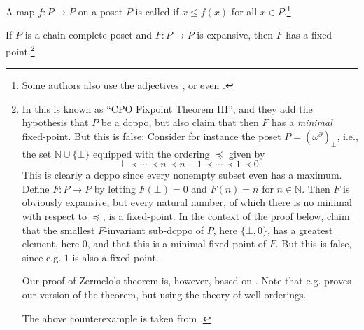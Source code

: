 \documentclass[a4paper, 11pt, article, danish, oneside]{memoir}
\newcommand{\naturals}{\mathbb{N}}
\newcommand*\union\cup
\begin{document}
A map $f \colon P \to P$ on a poset $P$ is called  if $x \leq f(x)$ for all $x \in P$.\footnote{Some authors also use the adjectives ,  or even .}

\begin{theorem}
    If $P$ is a chain-complete poset and $F \colon P \to P$ is expansive, then $F$ has a fixed-point.\footnote{In \textcite{davey-priestley-order} this is known as \enquote{CPO Fixpoint Theorem III}, and they add the hypothesis that $P$ be a dcppo, but also claim that then $F$ has a \emph{minimal} fixed-point. But this is false: Consider for instance the poset $P = (\omega^\partial)_\bot$, i.e., the set $\naturals \union \{\bot\}$ equipped with the ordering $\preceq$ given by
    \begin{equation*}
        \bot \prec \cdots \prec n \prec n-1 \prec \cdots \prec 1 \prec 0.
    \end{equation*}
    This is clearly a dcppo since every nonempty subset even has a maximum. Define $F \colon P \to P$ by letting $F(\bot) = 0$ and $F(n) = n$ for $n \in \naturals$. Then $F$ is obviously expansive, but every natural number, of which there is no minimal with respect to $\preceq$, is a fixed-point. In the context of the proof below, \citeauthor{davey-priestley-order} claim that the smallest $F$-invariant sub-dcppo of $P$, here $\{\bot, 0\}$, has a greatest element, here $0$, and that this is a minimal fixed-point of $F$. But this is false, since e.g. $1$ is also a fixed-point. \par Our proof of Zermelo's theorem is, however, based on \textcite[Exercise~8.20]{davey-priestley-order}. Note that e.g. \textcite[Theorem~7.35]{moschovakis-set-theory} proves our version of the theorem, but using the theory of well-orderings. \par The above counterexample is taken from \textcite{hansen-zermelo-stackexchange}.}
\end{theorem}
\end{document}
